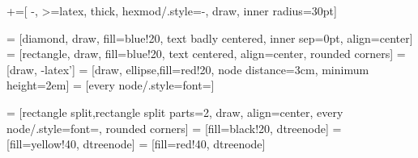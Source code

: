 \usepackage{tikz}
\usepackage{pgfplots}
\usetikzlibrary{arrows, positioning, er, fit, backgrounds,calc,shapes,decorations.pathreplacing}
+=[
	-,
	>=latex, 
	thick,
	hexmod/.style={-, draw, inner radius=30pt}]

\makeatletter
{} = [diamond, draw, fill=blue!20, text badly centered, inner sep=0pt, align=center]
 = [rectangle, draw, fill=blue!20, text centered, align=center, rounded corners]
 = [draw, -latex']
 = [draw, ellipse,fill=red!20, node distance=3cm, minimum height=2em]
 = [every node/.style={font=\scriptsize}]


 = [rectangle split,rectangle split parts=2, draw, align=center, every node/.style={font=\scriptsize}, rounded corners]
 = [fill=black!20, dtreenode]
 = [fill=yellow!40, dtreenode]
 = [fill=red!40, dtreenode]
\makeatother
